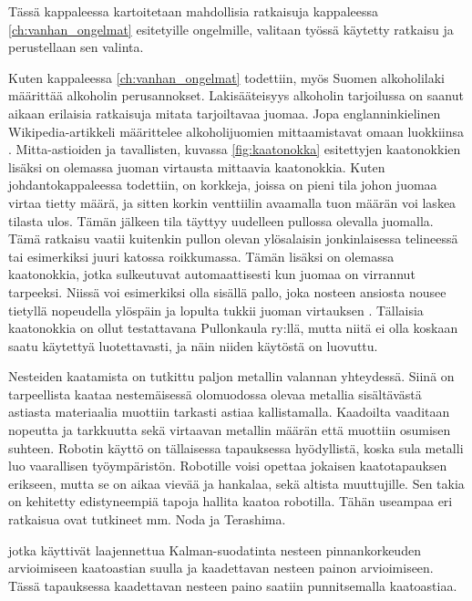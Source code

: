 Tässä kappaleessa kartoitetaan mahdollisia ratkaisuja kappaleessa \ref{ch:vanhan_ongelmat} esitetyille ongelmille, valitaan työssä käytetty ratkaisu ja perustellaan sen valinta.

Kuten kappaleessa \ref{ch:vanhan_ongelmat} todettiin, myös Suomen alkoholilaki määrittää alkoholin perusannokset. Lakisääteisyys alkoholin tarjoilussa on saanut aikaan erilaisia ratkaisuja mitata tarjoiltavaa juomaa. Jopa englanninkielinen Wikipedia-artikkeli määrittelee alkoholijuomien mittaamistavat omaan luokkiinsa \cite{Wikipedia}. Mitta-astioiden ja tavallisten, kuvassa \ref{fig:kaatonokka} esitettyjen kaatonokkien lisäksi on olemassa juoman virtausta mittaavia kaatonokkia. Kuten johdantokappaleessa todettiin, on korkkeja, joissa on pieni tila johon juomaa virtaa tietty määrä, ja sitten korkin venttiilin avaamalla tuon määrän voi laskea tilasta ulos. Tämän jälkeen tila täyttyy uudelleen pullossa olevalla juomalla. Tämä ratkaisu vaatii kuitenkin pullon olevan ylösalaisin jonkinlaisessa telineessä tai esimerkiksi juuri katossa roikkumassa. Tämän lisäksi on olemassa kaatonokkia, jotka sulkeutuvat automaattisesti kun juomaa on virrannut tarpeeksi. Niissä voi esimerkiksi olla sisällä pallo, joka nosteen ansiosta nousee tietyllä nopeudella ylöspäin ja lopulta tukkii juoman virtauksen \cite{Barproducts}. Tällaisia kaatonokkia on ollut testattavana Pullonkaula ry:llä, mutta niitä ei olla koskaan saatu käytettyä luotettavasti, ja näin niiden käytöstä on luovuttu.

Nesteiden kaatamista on tutkittu paljon metallin valannan yhteydessä. Siinä on tarpeellista kaataa nestemäisessä olomuodossa olevaa metallia sisältävästä astiasta materiaalia muottiin tarkasti astiaa kallistamalla. Kaadoilta vaaditaan nopeutta ja tarkkuutta sekä virtaavan metallin määrän että muottiin osumisen suhteen. Robotin käyttö on tällaisessa tapauksessa hyödyllistä, koska sula metalli luo vaarallisen työympäristön. Robotille voisi opettaa jokaisen kaatotapauksen erikseen, mutta se on aikaa vievää ja hankalaa, sekä altista muuttujille. Sen takia on kehitetty edistyneempiä tapoja hallita kaatoa robotilla. Tähän useampaa eri ratkaisua ovat tutkineet mm. Noda ja Terashima.

jotka käyttivät laajennettua Kalman-suodatinta nesteen pinnankorkeuden arvioimiseen kaatoastian suulla ja kaadettavan nesteen painon arvioimiseen. Tässä tapauksessa kaadettavan nesteen paino saatiin punnitsemalla kaatoastiaa.

